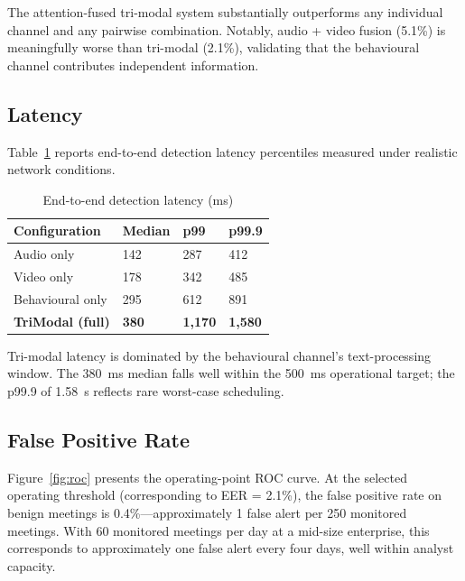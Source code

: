 \documentclass[sigconf,nonacm]{acmart}
\begin{document}
The attention-fused tri-modal system substantially outperforms any
individual channel and any pairwise combination. Notably, audio + video
fusion (5.1\%) is meaningfully worse than tri-modal (2.1\%), validating
that the behavioural channel contributes independent information.

\subsection{Latency}

Table~\ref{tab:latency} reports end-to-end detection latency
percentiles measured under realistic network conditions.

\begin{table}[h]
\caption{End-to-end detection latency (ms)}
\label{tab:latency}
\small
\begin{tabularx}{\columnwidth}{@{}p{3.0cm}X X X@{}}
\toprule
\textbf{Configuration} & \textbf{Median} & \textbf{p99} & \textbf{p99.9} \\
\midrule
Audio only       & 142  & 287   & 412  \\
Video only       & 178  & 342   & 485  \\
Behavioural only & 295  & 612   & 891  \\
\textbf{TriModal (full)} & \textbf{380} & \textbf{1{,}170} & \textbf{1{,}580} \\
\bottomrule
\end{tabularx}
\end{table}

Tri-modal latency is dominated by the behavioural channel's
text-processing window. The 380~ms median falls well within the
500~ms operational target; the p99.9 of 1.58~s reflects rare worst-case
scheduling.

\subsection{False Positive Rate}

Figure~\ref{fig:roc} presents the operating-point ROC curve. At the
selected operating threshold (corresponding to EER = 2.1\%), the false
positive rate on benign meetings is 0.4\%---approximately 1 false alert
per 250 monitored meetings. With 60 monitored meetings per day at a
mid-size enterprise, this corresponds to approximately one false alert
every four days, well within analyst capacity.
\end{document}
